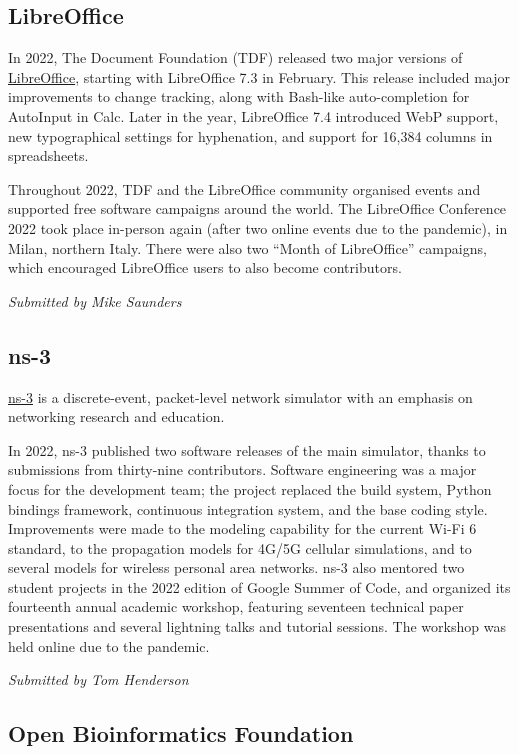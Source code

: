 \documentclass[a4paper]{report}
\begin{document}
\subsection{LibreOffice}

In 2022, The Document Foundation (TDF) released two major versions of \href{https://www.libreoffice.org/}{LibreOffice}, starting with LibreOffice 7.3 in February. This release included major improvements to change tracking, along with Bash-like auto-completion for AutoInput in Calc. Later in the year, LibreOffice 7.4 introduced WebP support, new typographical settings for hyphenation, and support for 16,384 columns in spreadsheets.

Throughout 2022, TDF and the LibreOffice community organised events and supported free software campaigns around the world. The LibreOffice Conference 2022 took place in-person again (after two online events due to the pandemic), in Milan, northern Italy. There were also two ``Month of LibreOffice'' campaigns, which encouraged LibreOffice users to also become contributors.

{\em Submitted by Mike Saunders}

\subsection{ns-3}

\href{https://www.nsnam.org}{ns-3} is a discrete-event, packet-level network simulator with an emphasis on networking research and education.

In 2022, ns-3 published two software releases of the main simulator, thanks to submissions from thirty-nine contributors.  Software engineering was a major focus for the development team; the project replaced the build system, Python bindings framework, continuous integration system, and the base coding style.  Improvements were made to the modeling capability for the current Wi-Fi 6 standard, to the propagation models for 4G/5G cellular simulations, and to several models for wireless personal area networks.  ns-3 also mentored two student projects in the 2022 edition of Google Summer of Code, and organized its fourteenth annual academic workshop, featuring seventeen technical paper presentations and several lightning talks and tutorial sessions. The workshop was held online due to the pandemic.

{\em Submitted by Tom Henderson}

\subsection{Open Bioinformatics Foundation}
\end{document}
